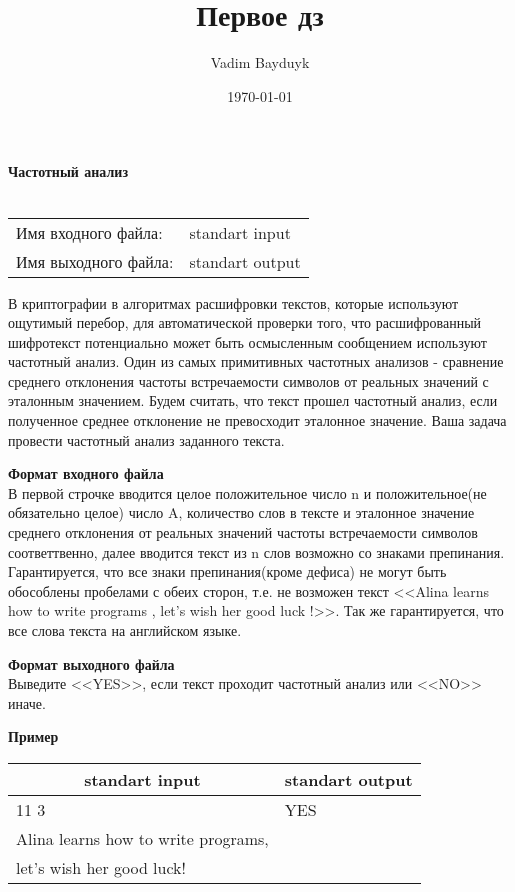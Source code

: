 \documentclass[10pt, a4paper]{article}
\title{Первое дз}
\author{Vadim Bayduyk}
\date{\today}
\begin{document}
	{\selectfont
		\noindent\LARGE\textbf{Частотный анализ}\\\\
		\normalsize
		\begin{tabular}{ll}
			\indent Имя входного файла: & standart input\\
			\indent Имя выходного файла: & standart output\\
		\end{tabular}
		
		\noindent В криптографии в алгоритмах расшифровки текстов, которые используют ощутимый перебор, для автоматической проверки того, что расшифрованный шифротекст потенциально может быть осмысленным сообщением используют частотный анализ. Один из самых примитивных частотных анализов  - сравнение среднего отклонения частоты встречаемости символов от реальных значений с эталонным значением. Будем считать, что текст прошел частотный анализ, если полученное среднее отклонение не превосходит эталонное значение. Ваша задача  провести частотный анализ заданного текста.
		
		\noindent\large\textbf{Формат входного файла}\\
		\normalsize В первой строчке вводится целое положительное число n и положительное(не обязательно целое) число A, количество слов в тексте и эталонное значение среднего отклонения от реальных значений частоты встречаемости символов соответтвенно, далее вводится текст из n слов возможно со знаками препинания. Гарантируется, что все знаки препинания(кроме дефиса) не могут быть обособлены пробелами с обеих сторон, т.е. не возможен текст <<Alina learns how to write programs  , let's wish her good luck !>>. Так же гарантируется, что все слова текста на английском языке. 
		
		\noindent\large\textbf{Формат выходного файла}\\\normalsize Выведите <<YES>>, если текст проходит частотный анализ или <<NO>> иначе.
		
		\noindent\large\textbf{Пример}\normalsize
		
		\noindent\begin{tabular}{|p{5,5cm}|p{}|}
			\hline
			\multicolumn{1}{|c|}{standart input} & \multicolumn{1}{c|}{standart output}\\\hline
			11 3 & YES \\
			Alina learns how to write programs, & \\
			let's wish her good luck! &\\\hline
		\end{tabular}
		
}
\end{document}
